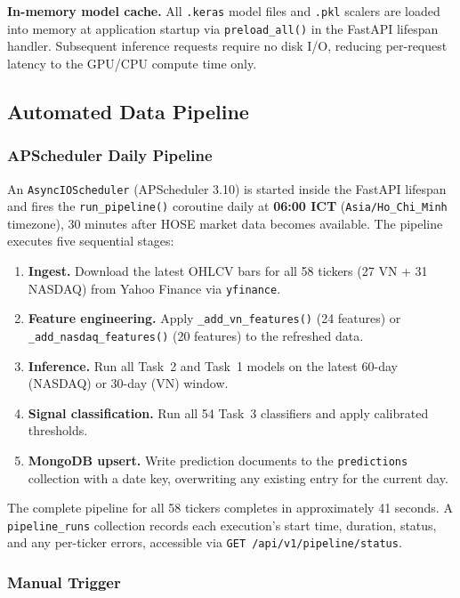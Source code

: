 \documentclass[12pt, a4paper]{article}
\begin{document}
\textbf{In-memory model cache.}
All \texttt{.keras} model files and \texttt{.pkl} scalers are loaded
into memory at application startup via \texttt{preload\_all()} in the
FastAPI lifespan handler. Subsequent inference requests require no
disk I/O, reducing per-request latency to the GPU/CPU compute time
only.

\subsection{Automated Data Pipeline}

\subsubsection{APScheduler Daily Pipeline}

An \texttt{AsyncIOScheduler} (APScheduler 3.10) is started inside the
FastAPI lifespan and fires the \texttt{run\_pipeline()} coroutine
daily at \textbf{06:00 ICT} (\texttt{Asia/Ho\_Chi\_Minh} timezone),
30 minutes after HOSE market data becomes available. The pipeline
executes five sequential stages:

\begin{enumerate}
  \item \textbf{Ingest.} Download the latest OHLCV bars for all 58
    tickers (27 VN + 31 NASDAQ) from Yahoo Finance via
    \texttt{yfinance}.
  \item \textbf{Feature engineering.} Apply \texttt{\_add\_vn\_features()}
    (24 features) or \texttt{\_add\_nasdaq\_features()} (20 features)
    to the refreshed data.
  \item \textbf{Inference.} Run all Task~2 and Task~1 models on the
    latest 60-day (NASDAQ) or 30-day (VN) window.
  \item \textbf{Signal classification.} Run all 54 Task~3 classifiers
    and apply calibrated thresholds.
  \item \textbf{MongoDB upsert.} Write prediction documents to the
    \texttt{predictions} collection with a date key, overwriting any
    existing entry for the current day.
\end{enumerate}

The complete pipeline for all 58 tickers completes in approximately
41 seconds. A \texttt{pipeline\_runs} collection records each
execution's start time, duration, status, and any per-ticker errors,
accessible via \texttt{GET /api/v1/pipeline/status}.

\subsubsection{Manual Trigger}
\end{document}
